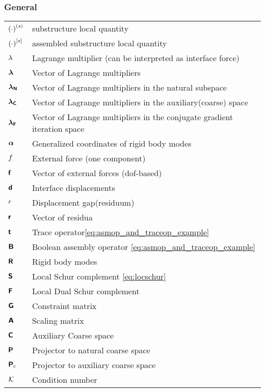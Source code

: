 \subsubsection*{General}
\begin{tabular}{l l}
${(\cdot)}^{(s)}$   &substructure local quantity  \\
${(\cdot)}^{[s]}$   &assembled substructure local quantity  \\
$\lambda$      &Lagrange multiplier (can be interpreted as interface force)\\
$\boldsymbol{ \mathsf{\lambda} }$   &Vector of Lagrange multipliers\\
$\boldsymbol{ \mathsf{\lambda_N} }$   &Vector of Lagrange multipliers in the natural subspace\\
$\boldsymbol{ \mathsf{\lambda_C} }$   &Vector of Lagrange multipliers in the auxiliary(coarse) space\\
$\boldsymbol{ \mathsf{\lambda_F} }$   &Vector of Lagrange multipliers in the conjugate gradient iteration space\\
$\boldsymbol{ \mathsf{\alpha} }$ &Generalized coordinates of rigid body modes\\
$f$    &External force (one component)\\
$\boldsymbol{ \mathsf{f} }$ &Vector of external forces (dof-based)\\
$\boldsymbol{ \mathsf{d} }$ &Interface displacements\\
$r$      &Displacement gap(residuum)\\
$\boldsymbol{ \mathsf{r} }$   &Vector of residua\\
$\boldsymbol{\mathsf{t}}$  &Trace operator\eqref{eq:asmop_and_traceop_example}\\
$\boldsymbol{\mathsf{B}}$    &Boolean assembly operator \eqref{eq:asmop_and_traceop_example}\\
$\boldsymbol{\mathsf{R}}$ &Rigid body modes\\
$\boldsymbol{\mathsf{S}}$ &Local Schur complement \eqref{eq:locschur}\\
$\boldsymbol{\mathsf{F}}$ &Local Dual Schur complement\\
$\boldsymbol{\mathsf{G}}$     &Constraint matrix\\
$\boldsymbol{\mathsf{A}}$ &Scaling matrix\\
$\boldsymbol{\mathsf{C}}$   & Auxiliary Coarse space\\
$\boldsymbol{\mathsf{P}}$    &Projector to natural coarse space\\
$\boldsymbol{\mathsf{P}}_c$    &Projector to auxiliary coarse space\\
$\mathcal{K}$  &Condition number\\
\end{tabular}
